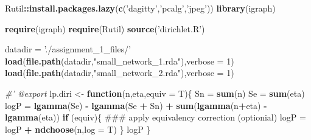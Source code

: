 \documentclass[]{article}
\newenvironment{Shaded}{\begin{snugshade}}{\end{snugshade}}
\newcommand{\KeywordTok}[1]{\textcolor[rgb]{0.13,0.29,0.53}{\textbf{#1}}}
\newcommand{\DataTypeTok}[1]{\textcolor[rgb]{0.13,0.29,0.53}{#1}}
\newcommand{\DecValTok}[1]{\textcolor[rgb]{0.00,0.00,0.81}{#1}}
\newcommand{\StringTok}[1]{\textcolor[rgb]{0.31,0.60,0.02}{#1}}
\newcommand{\CommentTok}[1]{\textcolor[rgb]{0.56,0.35,0.01}{\textit{#1}}}
\newcommand{\ControlFlowTok}[1]{\textcolor[rgb]{0.13,0.29,0.53}{\textbf{#1}}}
\newcommand{\OperatorTok}[1]{\textcolor[rgb]{0.81,0.36,0.00}{\textbf{#1}}}
\newcommand{\NormalTok}[1]{#1}
\theoremstyle{definition}
\theoremstyle{definition}
\theoremstyle{definition}
\theoremstyle{remark}
\begin{document}
\begin{Shaded}
\begin{Highlighting}[]
\NormalTok{Rutil}\OperatorTok{::}\KeywordTok{install.packages.lazy}\NormalTok{(}\KeywordTok{c}\NormalTok{(}\StringTok{'dagitty'}\NormalTok{,}\StringTok{'pcalg'}\NormalTok{,}\StringTok{'jpeg'}\NormalTok{))}
\KeywordTok{library}\NormalTok{(igraph)}

\KeywordTok{require}\NormalTok{(igraph)}
\KeywordTok{require}\NormalTok{(Rutil)}
\KeywordTok{source}\NormalTok{(}\StringTok{'dirichlet.R'}\NormalTok{)}

\NormalTok{datadir =}\StringTok{ './assignment_1_files/'}
\KeywordTok{load}\NormalTok{(}\KeywordTok{file.path}\NormalTok{(datadir,}\StringTok{"small_network_1.rda"}\NormalTok{),}\DataTypeTok{verbose =} \DecValTok{1}\NormalTok{)}
\KeywordTok{load}\NormalTok{(}\KeywordTok{file.path}\NormalTok{(datadir,}\StringTok{"small_network_2.rda"}\NormalTok{),}\DataTypeTok{verbose =} \DecValTok{1}\NormalTok{)}


\CommentTok{#' @export}
\NormalTok{lp.diri <-}\StringTok{ }\ControlFlowTok{function}\NormalTok{(n,eta,}\DataTypeTok{equiv =}\NormalTok{ T)\{}
\NormalTok{  Sn =}\StringTok{ }\KeywordTok{sum}\NormalTok{(n)}
\NormalTok{  Se =}\StringTok{ }\KeywordTok{sum}\NormalTok{(eta)}
\NormalTok{  logP =}\StringTok{ }\KeywordTok{lgamma}\NormalTok{(Se) }\OperatorTok{-}\StringTok{ }\KeywordTok{lgamma}\NormalTok{(Se }\OperatorTok{+}\StringTok{ }\NormalTok{Sn) }\OperatorTok{+}\StringTok{ }\KeywordTok{sum}\NormalTok{(}\KeywordTok{lgamma}\NormalTok{(n}\OperatorTok{+}\NormalTok{eta) }\OperatorTok{-}\StringTok{ }\KeywordTok{lgamma}\NormalTok{(eta))}
  \ControlFlowTok{if}\NormalTok{ (equiv)\{}
\NormalTok{    ### apply equivalency correction (optionial)}
\NormalTok{    logP =}\StringTok{ }\NormalTok{logP }\OperatorTok{+}\StringTok{ }\KeywordTok{ndchoose}\NormalTok{(n,}\DataTypeTok{log =}\NormalTok{ T)}
\NormalTok{  \}}
\NormalTok{  logP}
\NormalTok{\}}



\end{Highlighting}
\end{Shaded}
\end{document}
